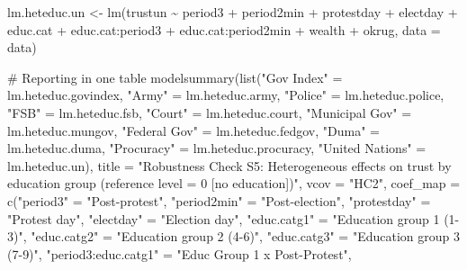 \documentclass[
  letterpaper,
  DIV=11,
  numbers=noendperiod]{scrartcl}
\newenvironment{Shaded}{\begin{snugshade}}{\end{snugshade}}
\newcommand{\AttributeTok}[1]{\textcolor[rgb]{0.40,0.45,0.13}{#1}}
\newcommand{\CommentTok}[1]{\textcolor[rgb]{0.37,0.37,0.37}{#1}}
\newcommand{\FunctionTok}[1]{\textcolor[rgb]{0.28,0.35,0.67}{#1}}
\newcommand{\NormalTok}[1]{\textcolor[rgb]{0.00,0.23,0.31}{#1}}
\newcommand{\OtherTok}[1]{\textcolor[rgb]{0.00,0.23,0.31}{#1}}
\newcommand{\SpecialCharTok}[1]{\textcolor[rgb]{0.37,0.37,0.37}{#1}}
\newcommand{\StringTok}[1]{\textcolor[rgb]{0.13,0.47,0.30}{#1}}
\begin{document}
\begin{Shaded}
\begin{Highlighting}[]
\NormalTok{lm.heteduc.un }\OtherTok{\textless{}{-}} \FunctionTok{lm}\NormalTok{(trustun }\SpecialCharTok{\textasciitilde{}}\NormalTok{ period3 }\SpecialCharTok{+}\NormalTok{ period2min }\SpecialCharTok{+}\NormalTok{ protestday }\SpecialCharTok{+}\NormalTok{ electday }\SpecialCharTok{+}
\NormalTok{                      educ.cat }\SpecialCharTok{+}\NormalTok{ educ.cat}\SpecialCharTok{:}\NormalTok{period3 }\SpecialCharTok{+}\NormalTok{ educ.cat}\SpecialCharTok{:}\NormalTok{period2min }\SpecialCharTok{+}
\NormalTok{                      wealth }\SpecialCharTok{+}\NormalTok{ okrug, }\AttributeTok{data =}\NormalTok{ data)}

\CommentTok{\# Reporting in one table}
\FunctionTok{modelsummary}\NormalTok{(}\FunctionTok{list}\NormalTok{(}\StringTok{"Gov Index"} \OtherTok{=}\NormalTok{ lm.heteduc.govindex, }\StringTok{"Army"} \OtherTok{=}\NormalTok{ lm.heteduc.army, }
                  \StringTok{"Police"} \OtherTok{=}\NormalTok{ lm.heteduc.police, }\StringTok{"FSB"} \OtherTok{=}\NormalTok{ lm.heteduc.fsb, }
                  \StringTok{"Court"} \OtherTok{=}\NormalTok{ lm.heteduc.court, }\StringTok{"Municipal Gov"} \OtherTok{=}\NormalTok{ lm.heteduc.mungov,}
                  \StringTok{"Federal Gov"} \OtherTok{=}\NormalTok{ lm.heteduc.fedgov, }\StringTok{"Duma"} \OtherTok{=}\NormalTok{ lm.heteduc.duma, }
                  \StringTok{"Procuracy"} \OtherTok{=}\NormalTok{ lm.heteduc.procuracy, }\StringTok{"United Nations"} \OtherTok{=}\NormalTok{ lm.heteduc.un),}
             \AttributeTok{title =} \StringTok{"Robustness Check S5: Heterogeneous effects on trust by education group (reference level = 0 [no education])"}\NormalTok{,}
             \AttributeTok{vcov =} \StringTok{"HC2"}\NormalTok{,}
             \AttributeTok{coef\_map =} \FunctionTok{c}\NormalTok{(}\StringTok{"period3"} \OtherTok{=} \StringTok{"Post{-}protest"}\NormalTok{,}
                          \StringTok{"period2min"} \OtherTok{=} \StringTok{"Post{-}election"}\NormalTok{,}
                          \StringTok{"protestday"} \OtherTok{=} \StringTok{"Protest day"}\NormalTok{,}
                          \StringTok{"electday"} \OtherTok{=} \StringTok{"Election day"}\NormalTok{,}
                          \StringTok{"educ.catg1"} \OtherTok{=} \StringTok{"Education group 1 (1{-}3)"}\NormalTok{,}
                          \StringTok{"educ.catg2"} \OtherTok{=} \StringTok{"Education group 2 (4{-}6)"}\NormalTok{,}
                          \StringTok{"educ.catg3"} \OtherTok{=} \StringTok{"Education group 3 (7{-}9)"}\NormalTok{,}
                          \StringTok{"period3:educ.catg1"} \OtherTok{=} \StringTok{"Educ Group 1 x Post{-}Protest"}\NormalTok{,}

\end{Highlighting}
\end{Shaded}
\end{document}
